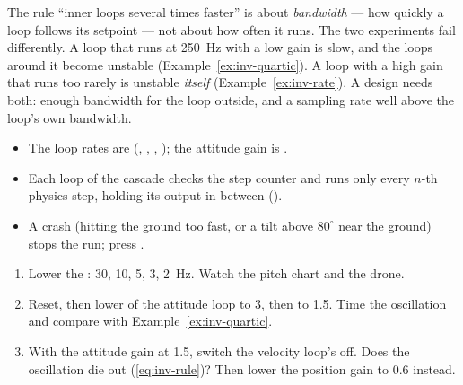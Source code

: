 \begin{watchout}
The rule \enquote{inner loops several times faster} is about \emph{bandwidth} — how quickly a loop follows its setpoint — not about how often it runs. The two experiments fail differently. A loop that runs at \SI{250}{Hz} with a low gain is slow, and the loops around it become unstable (Example~\ref{ex:inv-quartic}). A loop with a high gain that runs too rarely is unstable \emph{itself} (Example~\ref{ex:inv-rate}). A design needs both: enough bandwidth for the loop outside, and a sampling rate well above the loop's own bandwidth.
\end{watchout}


\begin{inapp}
\begin{itemize}[leftmargin=1.2em]
  \item The loop rates are  (, , , ); the attitude gain is .
  \item Each loop of the cascade checks the step counter and runs only every $n$-th physics step, holding its output in between ().
  \item A crash (hitting the ground too fast, or a tilt above $80^\circ$ near the ground) stops the run; press .
\end{itemize}
\end{inapp}

\begin{trythis}
\begin{enumerate}
  \item Lower the : 30, 10, 5, 3, \SI{2}{Hz}. Watch the pitch chart and the drone.
  \item Reset, then lower  of the attitude loop to 3, then to 1.5. Time the oscillation and compare with Example~\ref{ex:inv-quartic}.
  \item With the attitude gain at 1.5, switch the velocity loop's \It off. Does the oscillation die out (\cref{eq:inv-rule})? Then lower the position gain to 0.6 instead.
\end{enumerate}
\end{trythis}

